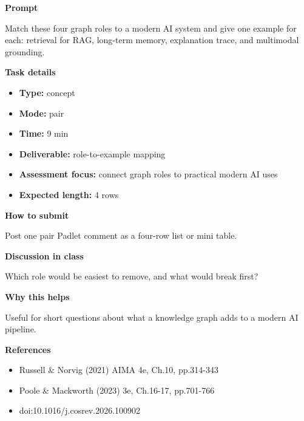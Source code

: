 \documentclass[11pt]{article}
\begin{document}
\begin{tcolorbox}[colback=white,colframe=MidnightBlue,title={Q1 Core Concept Check},fonttitle=\bfseries,breakable]
\begin{center}
\end{center}

{\large\bfseries\color{MidnightBlue} Prompt}\par\medskip
Match these four graph roles to a modern AI system and give one example for each: retrieval for RAG, long-term memory, explanation trace, and multimodal grounding.

{\large\bfseries\color{MidnightBlue} Task details}\par\medskip
\begin{itemize}\item \textbf{Type:} concept
\item \textbf{Mode:} pair
\item \textbf{Time:} 9 min
\item \textbf{Deliverable:} role-to-example mapping
\item \textbf{Assessment focus:} connect graph roles to practical modern AI uses
\item \textbf{Expected length:} 4 rows\end{itemize}

{\large\bfseries\color{MidnightBlue} How to submit}\par\medskip
Post one pair Padlet comment as a four-row list or mini table.

{\large\bfseries\color{MidnightBlue} Discussion in class}\par\medskip
Which role would be easiest to remove, and what would break first?

{\large\bfseries\color{MidnightBlue} Why this helps}\par\medskip
Useful for short questions about what a knowledge graph adds to a modern AI pipeline.

{\large\bfseries\color{MidnightBlue} References}\par\medskip
\begin{itemize}\item Russell \& Norvig (2021) AIMA 4e, Ch.10, pp.314-343
\item Poole \& Mackworth (2023) 3e, Ch.16-17, pp.701-766
\item doi:10.1016/j.cosrev.2026.100902\end{itemize}
\end{tcolorbox}
\end{document}
